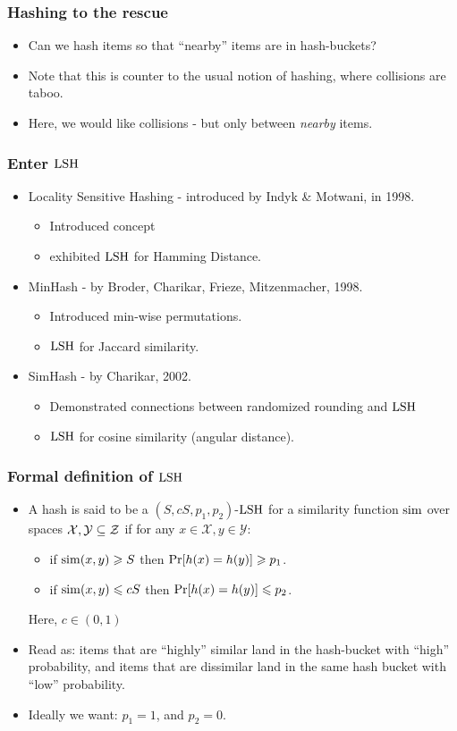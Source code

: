 \documentclass{beamer}
\begin{document}
\begin{frame}
\frametitle{Hashing to the rescue}
\begin{itemize}
\item Can we hash items so that ``nearby'' items are in  hash-buckets?
\item Note that this is counter to the usual notion of hashing, where collisions are taboo. 
\item Here, we would like collisions - but only between {\em nearby} items.
\end{itemize}
\end{frame}

\begin{frame}
\frametitle{Enter $\mathrm{LSH}$}
\begin{itemize}
\item Locality Sensitive Hashing - introduced by Indyk \& Motwani, in 1998. 
\begin{itemize}
\item Introduced concept
\item exhibited $\mathrm{LSH}$ for Hamming Distance.
\end{itemize}
\pause
\item MinHash - by Broder, Charikar, Frieze, Mitzenmacher, 1998.
\begin{itemize}
\item Introduced min-wise permutations.
\item $\mathrm{LSH}$ for Jaccard similarity.
\end{itemize}\pause
\item SimHash - by Charikar, 2002. 
\begin{itemize}
\item Demonstrated connections between randomized rounding and $\mathrm{LSH}$
\item $\mathrm{LSH}$ for cosine similarity (angular distance).
\end{itemize}
\end{itemize}
\end{frame}

\begin{frame}
\frametitle{Formal definition of $\mathrm{LSH}$}
\begin{itemize}
\item A hash is said to be a $(S, cS, p_1, p_2)$-$\mathrm{LSH}$ for a similarity function $\mathrm{sim}$ over spaces 
$\cal{X}, \cal{Y}\subseteq \cal{Z}$ if for any $x\in\mathcal{X}, y\in\mathcal{Y}$:
\begin{itemize}
\item if $\mathrm{sim}(x, y)\geqslant S$ then $\Pr[h(x)=h(y)]\geqslant p_1$.
\item if $\mathrm{sim}(x, y)\leqslant cS$ then $\Pr[h(x)=h(y)]\leqslant p_2$.
\end{itemize}
Here, $c \in (0, 1)$ \pause
\item Read as: items that are ``highly'' similar land in the  hash-bucket with ``high'' probability, and items that are dissimilar land in the same hash bucket with ``low'' probability.
\item Ideally we want: $p_1 = 1$, and $p_2 = 0$.
\end{itemize}
\end{frame}
\end{document}
